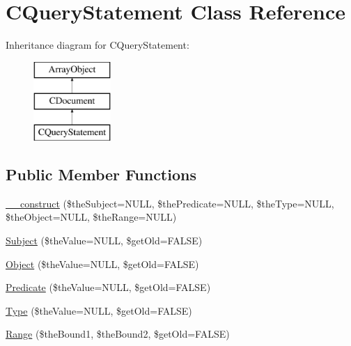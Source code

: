 \hypertarget{class_c_query_statement}{\section{C\-Query\-Statement Class Reference}
\label{class_c_query_statement}
}
Inheritance diagram for C\-Query\-Statement\-:\begin{figure}[H]
\begin{center}
\leavevmode
\includegraphics[height=3.000000cm]{class_c_query_statement}
\end{center}
\end{figure}
\subsection*{Public Member Functions}
\begin{DoxyCompactItemize}
\item 
\hyperlink{class_c_query_statement_a996b7a9ae1d54bc3f73de41501b5e02b}{\-\_\-\-\_\-construct} (\$the\-Subject=N\-U\-L\-L, \$the\-Predicate=N\-U\-L\-L, \$the\-Type=N\-U\-L\-L, \$the\-Object=N\-U\-L\-L, \$the\-Range=N\-U\-L\-L)
\item 
\hyperlink{class_c_query_statement_a5a27c44c892286e2fc77dc961d2e30d4}{Subject} (\$the\-Value=N\-U\-L\-L, \$get\-Old=F\-A\-L\-S\-E)
\item 
\hyperlink{class_c_query_statement_ae941698661c8f4b94ce08ea1eaad94b7}{Object} (\$the\-Value=N\-U\-L\-L, \$get\-Old=F\-A\-L\-S\-E)
\item 
\hyperlink{class_c_query_statement_a4a6c6eca496b006e21bfd9c18a31f116}{Predicate} (\$the\-Value=N\-U\-L\-L, \$get\-Old=F\-A\-L\-S\-E)
\item 
\hyperlink{class_c_query_statement_a37bbaad291c18c92954cc25dd49c117b}{Type} (\$the\-Value=N\-U\-L\-L, \$get\-Old=F\-A\-L\-S\-E)
\item 
\hyperlink{class_c_query_statement_a17cf641a4180129015bc0da8e83a7a4c}{Range} (\$the\-Bound1, \$the\-Bound2, \$get\-Old=F\-A\-L\-S\-E)
\end{DoxyCompactItemize}
